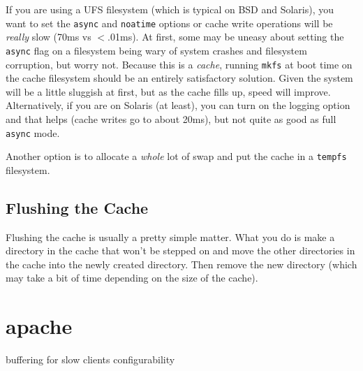 \documentclass[titlepage]{manual}
\begin{document}
If you are using a UFS filesystem (which is typical on BSD and Solaris),
you want to set the \texttt{async} and \texttt{noatime} options or cache
write operations will be \emph{really} slow (70ms vs $<$.01ms).  At first,
some may be uneasy about setting the \texttt{async} flag on a filesystem
being wary of system crashes and filesystem corruption, but worry not.
Because this is a \emph{cache}, running \texttt{mkfs} at boot time on the
cache filesystem should be an entirely satisfactory solution.  Given the
system will be a little sluggish at first, but as the cache fills up, speed
will improve.  Alternatively, if you are on Solaris (at least), you can 
turn on the logging option and that helps (cache writes go to about 20ms),
but not quite as good as full \texttt{async} mode.

Another option is to allocate a \emph{whole} lot of swap and put the
cache in a \texttt{tempfs} filesystem.
 
\subsection{Flushing the Cache}
Flushing the cache is usually a pretty simple matter.  What you do is
make a directory in the cache that won't be stepped on and move the
other directories in the cache into the newly created directory.  Then
remove the new directory (which may take a bit of time depending on
the size of the cache).

\section{apache}
    buffering for slow clients
    configurability
\end{document}
